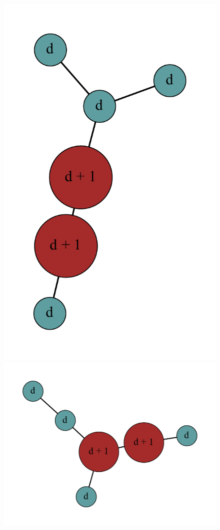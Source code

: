 \documentclass[12pt]{article}
\theoremstyle{plain}
\theoremstyle{definition}
\theoremstyle{remark}
\begin{document}
\begin{figure}[htb]
\includegraphics[scale=0.25]{Superabundance/MaxDegree3Trees/000110010001010[3,1,1,1,3,3].pdf}
\includegraphics[scale=0.25]{Superabundance/MaxDegree3Trees/001010011001000[2,3,1,1,1,4].pdf}

\end{figure}
\end{document}
